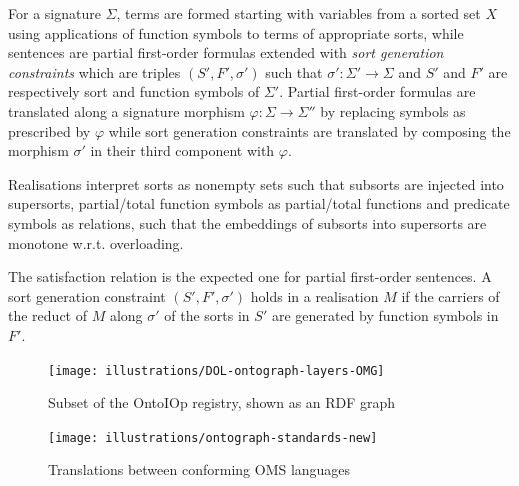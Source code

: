 \documentclass[10pt, a4paper]{isov2}
\begin{document}
For a signature $\Sigma$, terms are formed starting with
variables from a sorted set $X$ using 
applications of function symbols to terms of appropriate sorts, while
sentences are partial first-order formulas extended with
\emph{sort generation constraints} which are triples $(S', F', \sigma')$ such that 
$\sigma':\Sigma'\rightarrow\Sigma$ and $S'$ and $F'$ are respectively sort and function symbols of
$\Sigma'$. 
Partial first-order formulas are translated along a signature morphism 
$\varphi:\Sigma\rightarrow\Sigma''$ by replacing symbols as prescribed by $\varphi$
while sort generation constraints are translated by
composing the morphism $\sigma'$ in their third component with $\varphi$.

Realisations interpret sorts as nonempty sets such that subsorts are injected into supersorts,
partial/total function symbols as partial/total functions and 
predicate symbols as relations,
 such that the embeddings of subsorts into
supersorts are monotone w.r.t. overloading.

The satisfaction relation is the expected one for partial first-order sentences. A sort generation
constraint $(S', F', \sigma')$ holds in a realisation $M$ if the carriers of the reduct of $M$ along $\sigma'$ 
of the sorts in $S'$ are generated by function symbols in $F'$.



\cleardoublepage
{}\label{a:graph}

\begin{figure}
\centering
   \texttt{[image: illustrations/DOL-ontograph-layers-OMG]} 
  \caption{Subset of the OntoIOp registry, shown as an RDF graph}
\label{f:DOL-threelayers}
\end{figure}


\begin{figure}
  \centering
  \texttt{[image: illustrations/ontograph-standards-new]}
  \caption{Translations between conforming OMS languages}
  \label{fig:ontograph-standards}
\end{figure}
\end{document}
